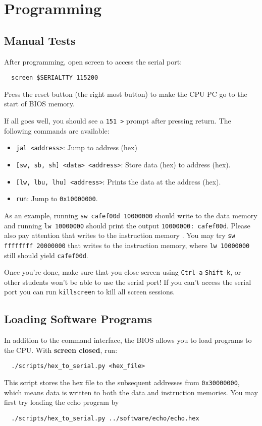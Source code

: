 \section{Programming} \label{sec:programming}
\subsection{Manual Tests}
After programming, open screen to access the serial port:
\begin{verbatim}
  screen $SERIALTTY 115200
\end{verbatim}
Press the reset button (the right most button) to make the CPU PC go to the start of BIOS memory.

If all goes well, you should see a \verb|151 >| prompt after pressing return.
The following commands are available:
\begin{itemize}
\item \verb|jal <address>|: Jump to address (hex)
\item \verb|[sw, sb, sh] <data> <address>|: Store data (hex) to address (hex).
\item \verb|[lw, lbu, lhu] <address>|: Prints the data at the address (hex).
\item \verb|run|: Jump to \verb|0x10000000|.
\end{itemize}

As an example, running \verb|sw cafef00d 10000000| should write to the data memory
and running \verb|lw 10000000| should print the output \verb|10000000: cafef00d|.
Please also pay attention that writes to the instruction memory .
You may try \verb|sw ffffffff 20000000| that writes to the instruction memory,
where \verb|lw 10000000| still should yield \verb|cafef00d|.

Once you're done, make sure that you close screen using \verb|Ctrl-a| \verb|Shift-k|,
or other students won't be able to use the serial port!
If you can't access the serial port you can run \verb|killscreen| to kill all screen sessions.

\subsection{Loading Software Programs}
In addition to the command interface,
the BIOS allows you to load programs to the CPU.
With {\bf screen closed}, run:
\begin{verbatim}
  ./scripts/hex_to_serial.py <hex_file>
\end{verbatim}
This script stores the hex file to the subsequent addresses from \verb|0x30000000|,
which means data is written to both the data and instruction memories.
You may first try loading the echo program by
\begin{verbatim}
  ./scripts/hex_to_serial.py ../software/echo/echo.hex
\end{verbatim}

